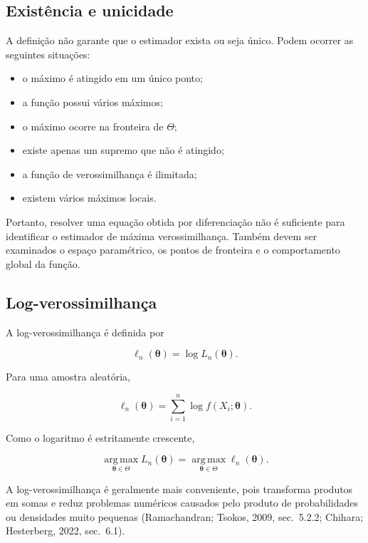 \documentclass[
  letterpaper,
  DIV=11,
  numbers=noendperiod]{scrreprt}
\providecommand{\tightlist}{%
  \setlength{\itemsep}{0pt}\setlength{\parskip}{0pt}}\usepackage{longtable,booktabs,array}
\begin{document}
\subsection{Existência e unicidade}\label{existuxeancia-e-unicidade}

A definição não garante que o estimador exista ou seja único. Podem
ocorrer as seguintes situações:

\begin{itemize}
\tightlist
\item
  o máximo é atingido em um único ponto;
\item
  a função possui vários máximos;
\item
  o máximo ocorre na fronteira de \(\Theta\);
\item
  existe apenas um supremo que não é atingido;
\item
  a função de verossimilhança é ilimitada;
\item
  existem vários máximos locais.
\end{itemize}

Portanto, resolver uma equação obtida por diferenciação não é suficiente
para identificar o estimador de máxima verossimilhança. Também devem ser
examinados o espaço paramétrico, os pontos de fronteira e o
comportamento global da função.

\subsection{Log-verossimilhança}\label{log-verossimilhanuxe7a}

A log-verossimilhança é definida por

\[\ell_n(\boldsymbol\theta)
=
\log L_n(\boldsymbol\theta).\]

Para uma amostra aleatória,

\[\ell_n(\boldsymbol\theta)
=
\sum_{i=1}^n
\log f(X_i;\boldsymbol\theta).\]

Como o logaritmo é estritamente crescente,

\[\operatorname*{arg\,max}_{\boldsymbol\theta\in\Theta}
L_n(\boldsymbol\theta)
=
\operatorname*{arg\,max}_{\boldsymbol\theta\in\Theta}
\ell_n(\boldsymbol\theta).\]

A log-verossimilhança é geralmente mais conveniente, pois transforma
produtos em somas e reduz problemas numéricos causados pelo produto de
probabilidades ou densidades muito pequenas (Ramachandran; Tsokos, 2009,
sec.~5.2.2; Chihara; Hesterberg, 2022, sec.~6.1).
\end{document}
